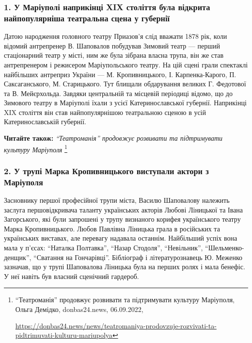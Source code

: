\subsubsection{1. У Маріуполі наприкінці XIX століття була відкрита найпопулярніша театральна сцена у губернії}

Датою народження головного театру Приазов'я слід вважати 1878 рік, коли відомий
антрепренер В. Шаповалов побудував Зимовий театр — перший стаціонарний театр у
місті, ним же була зібрана власна трупа, він же став антрепренером і режисером
Маріупольського театру. На цій сцені грали спектаклі найбільших антреприз
України — М. Кропивницького, І. Карпенка-Карого, П. Саксаганського, М.
Старицького. Тут блищали обдарування великих Г. Федотової та В. Мейєрхольда.
Завдяки центральній та місцевій періодиці відомо, що до Зимового театру в
Маріуполі їхали з усієї Катеринославської губернії. Наприкінці XIX століття він
став найпопулярнішою театральною сценою в усій Катеринославській губернії.


\textbf{Читайте також:} \emph{\enquote{Театроманія} продовжує розвивати та підтримувати культуру Маріуполя}%
\footnote{\enquote{Театроманія} продовжує розвивати та підтримувати культуру Маріуполя, Ольга Демідко, donbas24.news, 06.09.2022, \par%
\url{https://donbas24.news/news/teatromaniya-prodovzuje-rozvivati-ta-pidtrimuvati-kulturu-mariupolya}
}

\subsubsection{2. У трупі Марка Кропивницького виступали актори з Маріуполя}

Засновнику першої професійної трупи міста, Василю Шаповалову належить заслуга
першовідкривача таланту українських акторів Любові Ліницької та Івана
Загорського, які були запрошені у трупу визнаного корифея українського театру
Марка Кропивницького. Любов Павлівна Ліницька грала в російських та українських
виставах, але перевагу надавала останнім. Найбільший успіх вона мала у п'єсах:
\enquote{Наталка Полтавка}, \enquote{Назар Стодоля}, \enquote{Невільник}, \enquote{Шельменко-денщик}, \enquote{Сватання
на Гончарівці}. Бібліограф і літературознавець Ю. Меженко зазначав, що у трупі
Шаповалова Ліницька була на перших ролях і мала бенефіс. У неї навіть був
власний сценічний гардероб.

